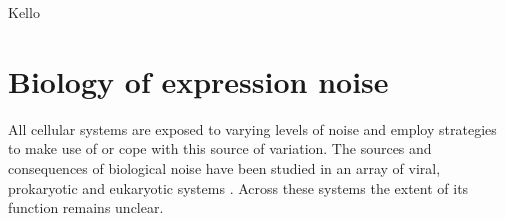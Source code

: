 Kello%

\section{Biology of expression noise} 

All cellular systems are exposed to varying levels of noise and employ strategies to make use of or cope with this source of variation. 
The sources and consequences of biological noise have been studied in an array of viral, prokaryotic and eukaryotic systems \citep{Raj2010, Balazsi2011, Eldar2010}. 
Across these systems the extent of its function remains unclear. 

